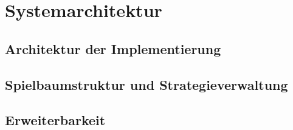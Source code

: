 \chapter{Systemarchitektur}

\section{Architektur der Implementierung}

\section{Spielbaumstruktur und Strategieverwaltung}

\section{Erweiterbarkeit}

